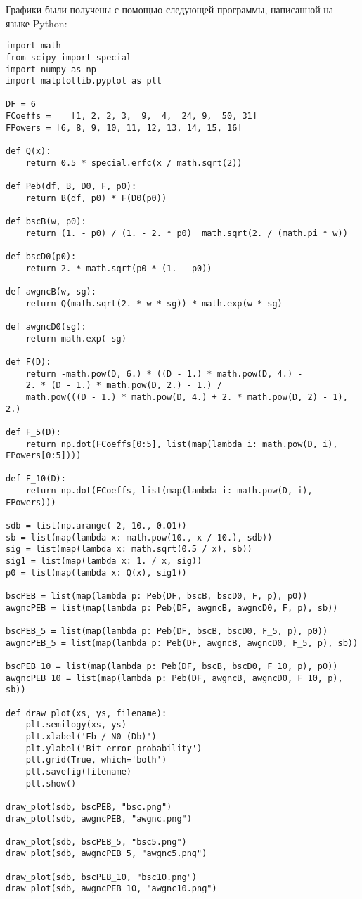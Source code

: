 \documentclass{article}
\begin{document}
Графики были получены с помощью следующей программы, написанной на языке Python:
\begin{lstlisting}[frame=single]
import math
from scipy import special
import numpy as np
import matplotlib.pyplot as plt

DF = 6
FCoeffs =    [1, 2, 2, 3,  9,  4,  24, 9,  50, 31]
FPowers = [6, 8, 9, 10, 11, 12, 13, 14, 15, 16]

def Q(x):
    return 0.5 * special.erfc(x / math.sqrt(2))

def Peb(df, B, D0, F, p0):
    return B(df, p0) * F(D0(p0))

def bscB(w, p0):
    return (1. - p0) / (1. - 2. * p0)  math.sqrt(2. / (math.pi * w))

def bscD0(p0):
    return 2. * math.sqrt(p0 * (1. - p0))

def awgncB(w, sg):
    return Q(math.sqrt(2. * w * sg)) * math.exp(w * sg)

def awgncD0(sg):
    return math.exp(-sg)

def F(D):
    return -math.pow(D, 6.) * ((D - 1.) * math.pow(D, 4.) -
    2. * (D - 1.) * math.pow(D, 2.) - 1.) /
    math.pow(((D - 1.) * math.pow(D, 4.) + 2. * math.pow(D, 2) - 1), 2.)

def F_5(D):
    return np.dot(FCoeffs[0:5], list(map(lambda i: math.pow(D, i), FPowers[0:5])))

def F_10(D):
    return np.dot(FCoeffs, list(map(lambda i: math.pow(D, i), FPowers)))

sdb = list(np.arange(-2, 10., 0.01))
sb = list(map(lambda x: math.pow(10., x / 10.), sdb))
sig = list(map(lambda x: math.sqrt(0.5 / x), sb))
sig1 = list(map(lambda x: 1. / x, sig))
p0 = list(map(lambda x: Q(x), sig1))

bscPEB = list(map(lambda p: Peb(DF, bscB, bscD0, F, p), p0))
awgncPEB = list(map(lambda p: Peb(DF, awgncB, awgncD0, F, p), sb))

bscPEB_5 = list(map(lambda p: Peb(DF, bscB, bscD0, F_5, p), p0))
awgncPEB_5 = list(map(lambda p: Peb(DF, awgncB, awgncD0, F_5, p), sb))

bscPEB_10 = list(map(lambda p: Peb(DF, bscB, bscD0, F_10, p), p0))
awgncPEB_10 = list(map(lambda p: Peb(DF, awgncB, awgncD0, F_10, p), sb))

def draw_plot(xs, ys, filename):
    plt.semilogy(xs, ys)
    plt.xlabel('Eb / N0 (Db)')
    plt.ylabel('Bit error probability')
    plt.grid(True, which='both')
    plt.savefig(filename)
    plt.show()

draw_plot(sdb, bscPEB, "bsc.png")
draw_plot(sdb, awgncPEB, "awgnc.png")

draw_plot(sdb, bscPEB_5, "bsc5.png")
draw_plot(sdb, awgncPEB_5, "awgnc5.png")

draw_plot(sdb, bscPEB_10, "bsc10.png")
draw_plot(sdb, awgncPEB_10, "awgnc10.png")
\end{lstlisting}
%
\end{document}
